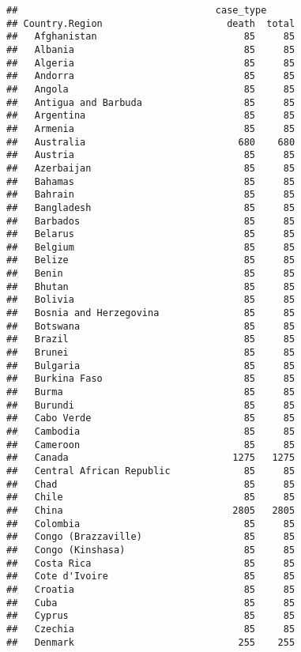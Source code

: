 \documentclass[]{article}
\begin{document}
\begin{verbatim}
##                                   case_type
## Country.Region                      death  total
##   Afghanistan                          85     85
##   Albania                              85     85
##   Algeria                              85     85
##   Andorra                              85     85
##   Angola                               85     85
##   Antigua and Barbuda                  85     85
##   Argentina                            85     85
##   Armenia                              85     85
##   Australia                           680    680
##   Austria                              85     85
##   Azerbaijan                           85     85
##   Bahamas                              85     85
##   Bahrain                              85     85
##   Bangladesh                           85     85
##   Barbados                             85     85
##   Belarus                              85     85
##   Belgium                              85     85
##   Belize                               85     85
##   Benin                                85     85
##   Bhutan                               85     85
##   Bolivia                              85     85
##   Bosnia and Herzegovina               85     85
##   Botswana                             85     85
##   Brazil                               85     85
##   Brunei                               85     85
##   Bulgaria                             85     85
##   Burkina Faso                         85     85
##   Burma                                85     85
##   Burundi                              85     85
##   Cabo Verde                           85     85
##   Cambodia                             85     85
##   Cameroon                             85     85
##   Canada                             1275   1275
##   Central African Republic             85     85
##   Chad                                 85     85
##   Chile                                85     85
##   China                              2805   2805
##   Colombia                             85     85
##   Congo (Brazzaville)                  85     85
##   Congo (Kinshasa)                     85     85
##   Costa Rica                           85     85
##   Cote d'Ivoire                        85     85
##   Croatia                              85     85
##   Cuba                                 85     85
##   Cyprus                               85     85
##   Czechia                              85     85
##   Denmark                             255    255

\end{verbatim}
\end{document}
